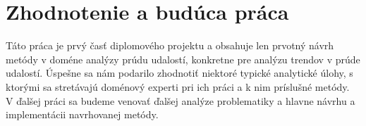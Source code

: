 \chapter{Zhodnotenie a budúca práca}
\label{Zhodnotenie a budúca práca}

Táto práca je prvý časť diplomového projektu a obsahuje len prvotný návrh metódy v doméne analýzy prúdu udalostí, konkretne pre analýzu trendov v prúde udalostí. Úspešne sa nám podarilo zhodnotiť niektoré typické analytické úlohy, s ktorými sa stretávajú doménový experti pri ich práci a k nim príslušné metódy.
\\
V ďalšej práci sa budeme venovať ďalšej analýze problematiky a hlavne návrhu a implementácii navrhovanej metódy.